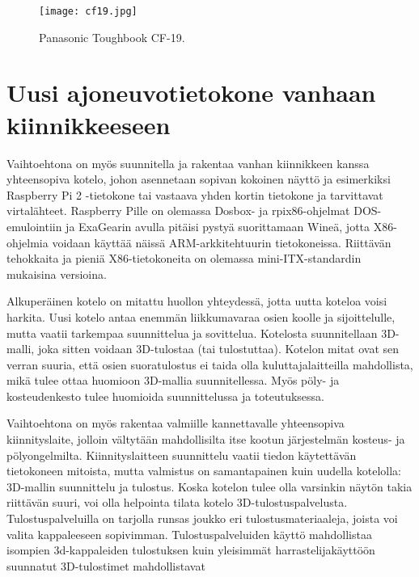 \begin{figure}[H]
\centering
\texttt{[image: cf19.jpg]}
\caption{Panasonic Toughbook CF-19.}
\label{kuva_cf19}
\end{figure}

\section{Uusi ajoneuvotietokone vanhaan kiinnikkeeseen}
Vaihtoehtona on myös suunnitella ja rakentaa vanhan kiinnikkeen kanssa yhteensopiva kotelo, johon asennetaan sopivan kokoinen näyttö ja esimerkiksi Raspberry Pi 2 -tietokone tai vastaava yhden kortin tietokone ja tarvittavat virtalähteet. Raspberry Pille on olemassa Dosbox- ja rpix86-ohjelmat DOS-emulointiin ja ExaGearin avulla pitäisi pystyä suorittamaan Wineä, jotta X86-ohjelmia voidaan käyttää näissä ARM-arkkitehtuurin tietokoneissa. Riittävän tehokkaita ja pieniä X86-tietokoneita on olemassa mini-ITX-standardin mukaisina versioina.

Alkuperäinen kotelo on mitattu huollon yhteydessä, jotta uutta koteloa voisi harkita. Uusi kotelo antaa enemmän liikkumavaraa osien koolle ja sijoittelulle, mutta vaatii tarkempaa suunnittelua ja sovittelua. Kotelosta suunnitellaan 3D-malli, joka sitten voidaan 3D-tulostaa (tai tulostuttaa). Kotelon mitat ovat sen verran suuria, että osien suoratulostus ei taida olla kuluttajalaitteilla mahdollista, mikä tulee ottaa huomioon 3D-mallia suunnitellessa. Myös pöly- ja kosteudenkesto tulee huomioida suunnittelussa ja toteutuksessa.

Vaihtoehtona on myös rakentaa valmiille kannettavalle yhteensopiva kiinnityslaite, jolloin vältytään mahdollisilta itse kootun järjestelmän kosteus- ja pölyongelmilta. Kiinnityslaitteen suunnittelu vaatii tiedon käytettävän tietokoneen mitoista, mutta valmistus on samantapainen kuin uudella kotelolla: 3D-mallin suunnittelu ja tulostus. Koska kotelon tulee olla varsinkin näytön takia riittävän suuri, voi olla helpointa tilata kotelo 3D-tulostuspalvelusta. Tulostuspalveluilla on tarjolla runsas joukko eri tulostusmateriaaleja, joista voi valita kappaleeseen sopivimman. Tulostuspalveluiden käyttö mahdollistaa isompien 3d-kappaleiden tulostuksen kuin yleisimmät harrastelijakäyttöön suunnatut 3D-tulostimet mahdollistavat \cite{3d_shapeways, 3d_ultimaker}



